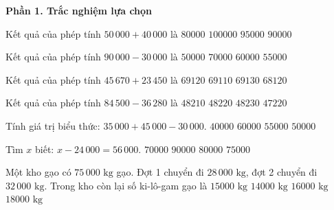 \textbf{Phần 1. Trắc nghiệm lựa chọn}

\begin{ex} %
Kết quả của phép tính $50\,000 + 40\,000$ là
\choice
{$80000$}
{$100000$}
{$95000$}
{\True $90000$}
\end{ex}

\begin{ex} %
Kết quả của phép tính $90\,000 - 30\,000$ là
\choice
{$50000$}
{$70000$}
{\True $60000$}
{$55000$}
\end{ex}

\begin{ex} %
Kết quả của phép tính $45\,670 + 23\,450$ là
\choice
{\True $69120$}
{$69110$}
{$69130$}
{$68120$}
\end{ex}

\begin{ex} %
Kết quả của phép tính $84\,500 - 36\,280$ là
\choice
{$48210$}
{\True $48220$}
{$48230$}
{$47220$}
\end{ex}

\begin{ex} %
Tính giá trị biểu thức: $35\,000 + 45\,000 - 30\,000$.
\choice
{$40000$}
{$60000$}
{$55000$}
{\True $50000$}
\end{ex}

\begin{ex} %
Tìm $x$ biết: $x - 24\,000 = 56\,000$.
\choice
{$70000$}
{$90000$}
{\True $80000$}
{$75000$}
\end{ex}

\begin{ex} %
Một kho gạo có $75\,000\text{ kg}$ gạo. Đợt 1 chuyển đi $28\,000\text{ kg}$, đợt 2 chuyển đi $32\,000\text{ kg}$. Trong kho còn lại số ki-lô-gam gạo là
\choice
{\True $15000\text{ kg}$}
{$14000\text{ kg}$}
{$16000\text{ kg}$}
{$18000\text{ kg}$}
\end{ex}

